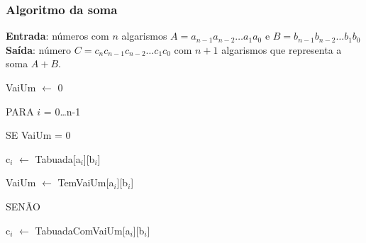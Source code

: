 \documentclass{beamer}
\begin{document}
\begin{frame}
\frametitle{Algoritmo da soma}

\textbf{Entrada}: números com $n$ algarismos $A = a_{n-1} a_{n-2} \ldots a_1
a_0$ e $B = b_{n-1} b_{n-2} \ldots b_1 b_0$\\
\textbf{Saída}: número $C = c_n c_{n-1} c_{n-2} \ldots c_1 c_0$ com $n+1$
algarismos que representa a soma $A+B$.\\[12pt]

\def\ts{\hspace{2ex}}

\begin{minipage}{0.55\textwidth}
\begin{semiverbatim}
VaiUm $\leftarrow$ 0

PARA $i$ = 0\ldots{}n-1

\ts SE VaiUm = 0

\ts\ts  c$_i$ $\leftarrow$ Tabuada[a$_i$][b$_i$]

\ts\ts VaiUm $\leftarrow$ TemVaiUm[a$_i$][b$_i$]

\ts SENÃO

\ts\ts  c$_i$ $\leftarrow$ TabuadaComVaiUm[a$_i$][b$_i$]


\end{semiverbatim}
\end{minipage}
\end{frame}
\end{document}
